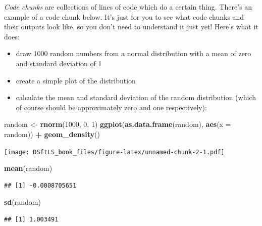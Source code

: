 \documentclass[
]{book}
\newenvironment{Shaded}{\begin{snugshade}}{\end{snugshade}}
\newcommand{\DataTypeTok}[1]{\textcolor[rgb]{0.13,0.29,0.53}{#1}}
\newcommand{\DecValTok}[1]{\textcolor[rgb]{0.00,0.00,0.81}{#1}}
\newcommand{\KeywordTok}[1]{\textcolor[rgb]{0.13,0.29,0.53}{\textbf{#1}}}
\newcommand{\NormalTok}[1]{#1}
\newcommand{\OperatorTok}[1]{\textcolor[rgb]{0.81,0.36,0.00}{\textbf{#1}}}
\newcommand{\StringTok}[1]{\textcolor[rgb]{0.31,0.60,0.02}{#1}}
\providecommand{\tightlist}{%
  \setlength{\itemsep}{0pt}\setlength{\parskip}{0pt}}
\begin{document}
\emph{Code chunks} are collections of lines of code which do a certain thing. There's
an example of a code chunk below. It's just for you to see what code chunks and
their outputs look like, so you don't need to understand it just yet! Here's
what it does:

\begin{itemize}
\tightlist
\item
  draw 1000 random numbers from a normal distribution with a mean of zero
  and standard deviation of 1
\item
  create a simple plot of the distribution
\item
  calculate the mean and standard deviation of the random distribution (which
  of course should be approximately zero and one respectively):
\end{itemize}

\begin{Shaded}
\begin{Highlighting}[]
\NormalTok{random <-}\StringTok{ }\KeywordTok{rnorm}\NormalTok{(}\DecValTok{1000}\NormalTok{, }\DecValTok{0}\NormalTok{, }\DecValTok{1}\NormalTok{)}
\KeywordTok{ggplot}\NormalTok{(}\KeywordTok{as.data.frame}\NormalTok{(random), }\KeywordTok{aes}\NormalTok{(}\DataTypeTok{x =}\NormalTok{ random)) }\OperatorTok{+}\StringTok{ }
\StringTok{    }\KeywordTok{geom_density}\NormalTok{()}
\end{Highlighting}
\end{Shaded}

\texttt{[image: DSftLS\_book\_files/figure-latex/unnamed-chunk-2-1.pdf]}

\begin{Shaded}
\begin{Highlighting}[]
\KeywordTok{mean}\NormalTok{(random)}
\end{Highlighting}
\end{Shaded}

\begin{verbatim}
## [1] -0.0008705651
\end{verbatim}

\begin{Shaded}
\begin{Highlighting}[]
\KeywordTok{sd}\NormalTok{(random)}
\end{Highlighting}
\end{Shaded}

\begin{verbatim}
## [1] 1.003491
\end{verbatim}
\end{document}

